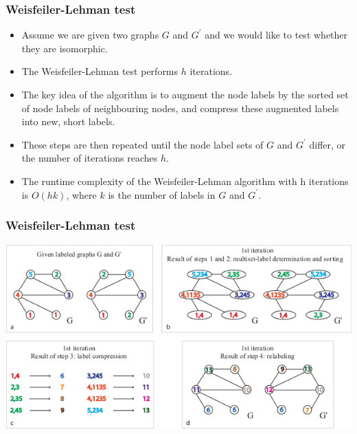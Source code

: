 \documentclass{beamer}
\begin{document}

\begin{frame}
\frametitle{Weisfeiler-Lehman test}

\begin{itemize}
\item
Assume we are given two graphs $G$ and $G^\prime$ and we would like to test whether they are isomorphic.
\item
The Weisfeiler-Lehman test performs $h$ iterations.
\item
The key idea of the algorithm is to augment the node labels by the sorted set of node labels of neighbouring nodes, and compress these augmented labels into new, short labels.
\item
These steps are then repeated until the node label sets of $G$ and $G^\prime$ differ, or the number of iterations reaches $h$.
\item
The runtime complexity of the Weisfeiler-Lehman algorithm with h iterations is $O(hk)$, where $k$ is the number of labels in $G$ and $G^\prime$.
\end{itemize}

\end{frame}


\begin{frame}
\frametitle{Weisfeiler-Lehman test}

\begin{center}
\begin{figure}
\end{figure}
\includegraphics[width=\textwidth]{img/wl_iteration_upper.png}
\end{center}

\end{frame}
\end{document}
